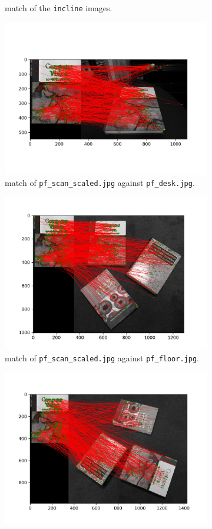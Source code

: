 \documentclass[11pt]{article}
\newcommand{\code}[1]{\texttt{#1}}
\begin{document}
\begin{figure}[h!]
\begin{subfigure}{.49\textwidth}
      \caption{match of the \code{incline} images. }
    \end{subfigure}
    \begin{subfigure}{.327\textwidth}
      \centering
      \includegraphics[width=.8\linewidth]{../results/pf_desk_match.jpg}
      \caption{match of \code{pf\_scan\_scaled.jpg} against \code{pf\_desk.jpg}.}
    \end{subfigure}
    \begin{subfigure}{.327\textwidth}
      \centering
      \includegraphics[width=.8\linewidth]{../results/pf_floor_match.jpg}
      \caption{match of \code{pf\_scan\_scaled.jpg} against \code{pf\_floor.jpg}.}
    \end{subfigure}
    \begin{subfigure}{.327\textwidth}
      \centering
      \includegraphics[width=.8\linewidth]{../results/pf_floor_rot_match.jpg}

\end{subfigure}
\end{figure}
\end{document}
